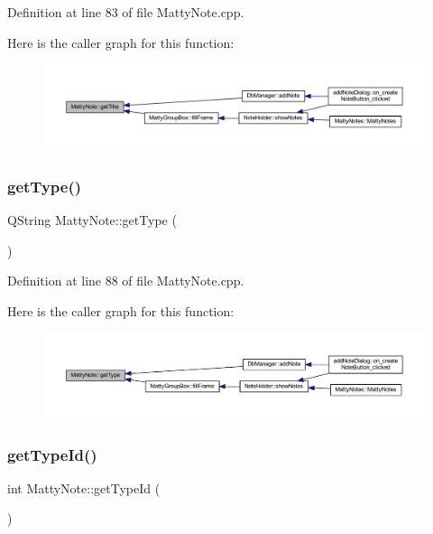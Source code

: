 Definition at line 83 of file Matty\+Note.\+cpp.

Here is the caller graph for this function\+:
\nopagebreak
\begin{figure}[H]
\begin{center}
\leavevmode
\includegraphics[width=350pt]{classMattyNote_acb4af77f4177a0b17f140d4b4421e32e_icgraph}
\end{center}
\end{figure}
\hypertarget{classMattyNote_ad07b65692d79cf25e5c9008e111bd999}{}\label{classMattyNote_ad07b65692d79cf25e5c9008e111bd999} 
\subsubsection{\texorpdfstring{get\+Type()}{getType()}}
{\footnotesize\ttfamily Q\+String Matty\+Note\+::get\+Type (\begin{DoxyParamCaption}{ }\end{DoxyParamCaption})}



Definition at line 88 of file Matty\+Note.\+cpp.

Here is the caller graph for this function\+:
\nopagebreak
\begin{figure}[H]
\begin{center}
\leavevmode
\includegraphics[width=350pt]{classMattyNote_ad07b65692d79cf25e5c9008e111bd999_icgraph}
\end{center}
\end{figure}
\hypertarget{classMattyNote_af5b90028a8e406e41b8c8a6de83685ef}{}\label{classMattyNote_af5b90028a8e406e41b8c8a6de83685ef} 
\subsubsection{\texorpdfstring{get\+Type\+Id()}{getTypeId()}}
{\footnotesize\ttfamily int Matty\+Note\+::get\+Type\+Id (\begin{DoxyParamCaption}{ }\end{DoxyParamCaption})}



